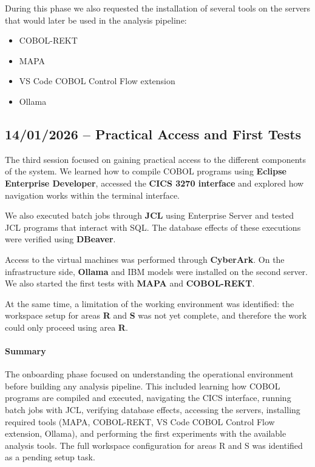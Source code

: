 \documentclass[11pt]{article}
\begin{document}
During this phase we also requested the installation of several tools on the servers that would later be used in the analysis pipeline:

\begin{itemize}
\item COBOL-REKT
\item MAPA
\item VS Code COBOL Control Flow extension
\item Ollama
\end{itemize}

\subsection*{14/01/2026 -- Practical Access and First Tests}

The third session focused on gaining practical access to the different components of the system. We learned how to compile COBOL programs using \textbf{Eclipse Enterprise Developer}, accessed the \textbf{CICS 3270 interface} and explored how navigation works within the terminal interface.

We also executed batch jobs through \textbf{JCL} using Enterprise Server and tested JCL programs that interact with SQL. The database effects of these executions were verified using \textbf{DBeaver}.

Access to the virtual machines was performed through \textbf{CyberArk}. On the infrastructure side, \textbf{Ollama} and IBM models were installed on the second server. We also started the first tests with \textbf{MAPA} and \textbf{COBOL-REKT}.

At the same time, a limitation of the working environment was identified: the workspace setup for areas \textbf{R} and \textbf{S} was not yet complete, and therefore the work could only proceed using area \textbf{R}.

\paragraph{Summary}

The onboarding phase focused on understanding the operational environment before building any analysis pipeline. This included learning how COBOL programs are compiled and executed, navigating the CICS interface, running batch jobs with JCL, verifying database effects, accessing the servers, installing required tools (MAPA, COBOL-REKT, VS Code COBOL Control Flow extension, Ollama), and performing the first experiments with the available analysis tools. The full workspace configuration for areas R and S was identified as a pending setup task.
\end{document}
